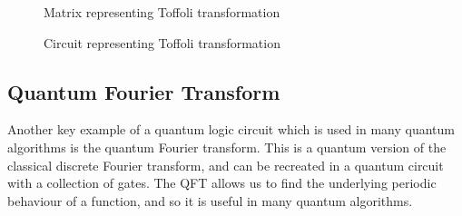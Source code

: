 \begin{figure}[!htb]
\centering
\resizebox{5cm}{!}{}
\caption{Matrix representing Toffoli transformation}
\label{fig:toffolimatrix}
\end{figure}
\begin{figure}[!htb]
\centering
\resizebox{1.5cm}{!}{}
\caption{Circuit representing Toffoli transformation}
\label{fig:toffolicircuit}
\end{figure}
\subsection{Quantum Fourier Transform}
Another key example of a quantum logic circuit which is used in many quantum algorithms is the quantum Fourier transform. This is a quantum version of the classical discrete Fourier transform, and can be recreated in a quantum circuit with a collection of gates. The QFT allows us to find the underlying periodic behaviour of a function, and so it is useful in many quantum algorithms.
